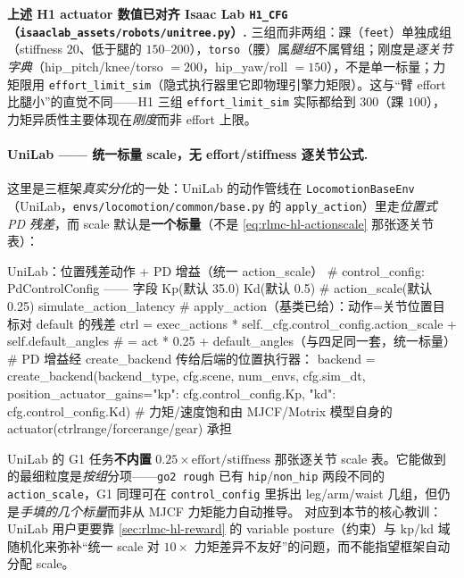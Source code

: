\begin{note}
\textbf{上述 H1 actuator 数值已对齐 Isaac Lab \texttt{H1\_CFG}（\texttt{isaaclab\_assets/robots/unitree.py}）.}\;
三组而非两组：踝（\texttt{feet}）单独成组（stiffness $20$、低于腿的 $150$--$200$），\texttt{torso}（腰）属\emph{腿组}不属臂组；刚度是\emph{逐关节字典}（hip\_pitch/knee/torso $=200$，hip\_yaw/roll $=150$），不是单一标量；力矩限用 \texttt{effort\_limit\_sim}（隐式执行器里它即物理引擎力矩限）。这与“臂 effort 比腿小”的直觉不同——H1 三组 \texttt{effort\_limit\_sim} 实际都给到 $300$（踝 $100$），力矩异质性主要体现在\emph{刚度}而非 effort 上限。
\end{note}

\paragraph{UniLab —— 统一标量 scale，无 effort/stiffness 逐关节公式.}
这里是三框架\emph{真实分化}的一处：UniLab 的动作管线在 \texttt{LocomotionBaseEnv}（UniLab，\texttt{envs/locomotion/common/base.py} 的 \texttt{apply\_action}）里走\emph{位置式 PD 残差}，而 scale 默认是\textbf{一个标量}（不是 \eqref{eq:rlmc-hl-actionscale} 那张逐关节表）：

\begin{codebox}[Python]{UniLab：位置残差动作 + PD 增益（统一 action\_scale）}
# control_config: PdControlConfig —— 字段 Kp(默认 35.0) Kd(默认 0.5)
#   action_scale(默认 0.25) simulate_action_latency
# apply_action（基类已给）：动作=关节位置目标对 default 的残差
ctrl = exec_actions * self._cfg.control_config.action_scale + self.default_angles
#   = act * 0.25 + default_angles（与四足同一套，统一标量）
# PD 增益经 create_backend 传给后端的位置执行器：
backend = create_backend(backend_type, cfg.scene, num_envs, cfg.sim_dt,
                         position_actuator_gains={"kp": cfg.control_config.Kp,
                                                  "kd": cfg.control_config.Kd})
# 力矩/速度饱和由 MJCF/Motrix 模型自身的 actuator(ctrlrange/forcerange/gear) 承担
\end{codebox}

UniLab 的 G1 任务\textbf{不内置} $0.25\times\text{effort}/\text{stiffness}$ 那张逐关节 scale 表。它能做到的最细粒度是\emph{按组}分项——\texttt{go2 rough} 已有 \texttt{hip}/\texttt{non\_hip} 两段不同的 \texttt{action\_scale}，G1 同理可在 \texttt{control\_config} 里拆出 leg/arm/waist 几组，但仍是\emph{手填的几个标量}而非从 MJCF 力矩能力自动推导。 对应到本节的核心教训：UniLab 用户更要靠 \cref{sec:rlmc-hl-reward} 的 variable posture（约束）与 kp/kd 域随机化来弥补“统一 scale 对 $10\times$ 力矩差异不友好”的问题，而不能指望框架自动分配 scale。

